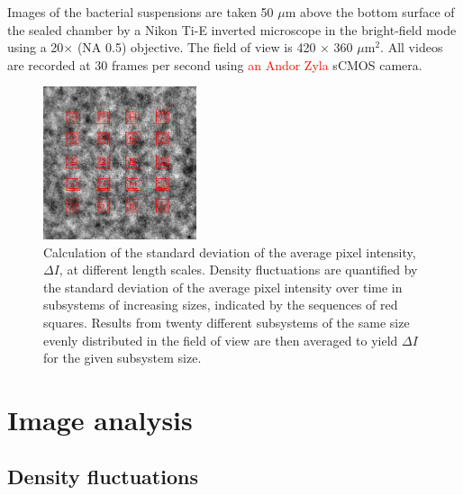 \documentclass[twocolumn,aps,prx,amsmath,amssymb,longbibliography,superscriptaddress]{revtex4-2}
\begin{document}
Images of the bacterial suspensions are taken 50 $\mu$m above the bottom surface of the sealed chamber by a Nikon Ti-E inverted microscope in the bright-field mode using a 20$\times$ (NA 0.5) objective. The field of view is 420 $\times$ 360 $\mu$m$^2$. All videos are recorded at 30 frames per second using \textcolor{red}{an Andor Zyla} sCMOS camera.

\begin{figure}[t]
	\begin{center}
		\includegraphics[width=0.4\textwidth]{Figures/fig-7.pdf}
		\caption[GNF calculations]
		{Calculation of the standard deviation of the average pixel intensity, $\Delta I$, at different length scales. Density fluctuations are quantified by the standard deviation of the average pixel intensity over time in subsystems of increasing sizes, indicated by the sequences of red squares. Results from twenty different subsystems of the same size evenly distributed in the field of view are then averaged to yield $\Delta I$ for the given subsystem size.}
		\label{GNF-calculation}
	\end{center}
\end{figure}


\section{Image analysis} \label{appendix-IA}
\subsection{Density fluctuations} \label{sec:GNF-calculations}
\end{document}
